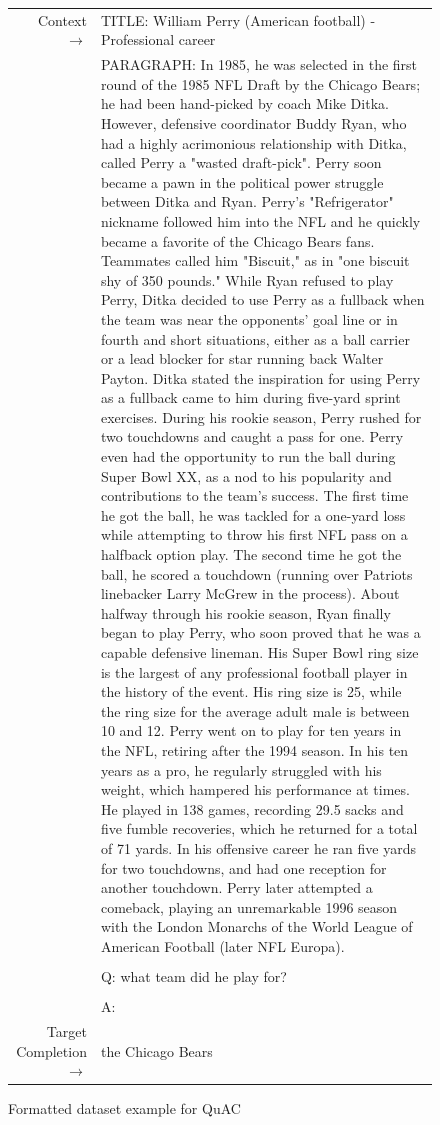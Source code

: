 \documentclass{article}
\begin{document}
\begin{figure} { \tt \footnotesize \begin{tabularx}{\linewidth}{r X} \toprule Context $\to$ & TITLE: William Perry (American football) - Professional career \\ 
 & PARAGRAPH: In 1985, he was selected in the first round of the 1985 NFL Draft by the Chicago Bears; he had been hand-picked by coach Mike Ditka. However, defensive coordinator Buddy Ryan, who had a highly acrimonious relationship with Ditka, called Perry a "wasted draft-pick". Perry soon became a pawn in the political power struggle between Ditka and Ryan.  Perry's "Refrigerator" nickname followed him into the NFL and he quickly became a favorite of the Chicago Bears fans. Teammates called him "Biscuit," as in "one biscuit shy of 350 pounds."  While Ryan refused to play Perry, Ditka decided to use Perry as a fullback when the team was near the opponents' goal line or in fourth and short situations, either as a ball carrier or a lead blocker for star running back Walter Payton. Ditka stated the inspiration for using Perry as a fullback came to him during five-yard sprint exercises. During his rookie season, Perry rushed for two touchdowns and caught a pass for one. Perry even had the opportunity to run the ball during Super Bowl XX, as a nod to his popularity and contributions to the team's success. The first time he got the ball, he was tackled for a one-yard loss while attempting to throw his first NFL pass on a halfback option play. The second time he got the ball, he scored a touchdown (running over Patriots linebacker Larry McGrew in the process). About halfway through his rookie season, Ryan finally began to play Perry, who soon proved that he was a capable defensive lineman.  His Super Bowl ring size is the largest of any professional football player in the history of the event. His ring size is 25, while the ring size for the average adult male is between 10 and 12.  Perry went on to play for ten years in the NFL, retiring after the 1994 season. In his ten years as a pro, he regularly struggled with his weight, which hampered his performance at times. He played in 138 games, recording 29.5 sacks and five fumble recoveries, which he returned for a total of 71 yards. In his offensive career he ran five yards for two touchdowns, and had one reception for another touchdown. Perry later attempted a comeback, playing an unremarkable 1996 season with the London Monarchs of the World League of American Football (later NFL Europa). \\ 
 &  \\ 
 & Q: what team did he play for? \\ 
 &  \\ 
 & A: \\ 
 \midrule Target Completion $\to$ & the Chicago Bears \\
\bottomrule \end{tabularx} }  \caption{Formatted dataset example for QuAC}  \label{eval:Quac}  \end{figure}
\end{document}
